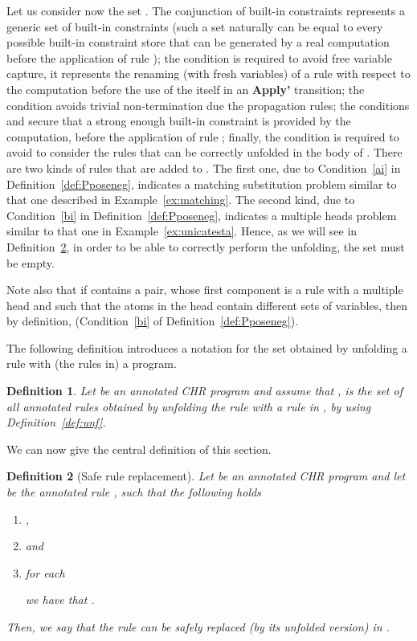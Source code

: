 \documentclass{tlp}
\newtheorem{definition}{Definition} \newtheorem{proposition}{Proposition} \newtheorem{example}{Example} \newtheorem{corollary}{Corollary} \newtheorem{theorem}{Theorem} \newtheorem{lemma}{Lemma}
\begin{document}
Let us consider now the set .
The conjunction of built-in constraints 
represents a generic set of built-in constraints
(such a set naturally can be equal to every possible built-in constraint store that can
be generated by a real computation before the application of rule ); the
condition 
is required to avoid free variable capture,
it represents the renaming (with fresh variables) of a rule  with respect to the computation
before the use of the  itself in an \textbf{Apply'} transition;
the condition  avoids trivial non-termination due the propagation rules;
the conditions  and
 secure that a strong enough built-in constraint
is provided by the computation, before the application of rule ;
finally, the condition
 is required
to avoid to consider the rules that can be correctly unfolded in the body of .
There are two kinds of rules that are added to .
The first one, due to Condition~\ref{ai} in Definition~\ref{def:Pposeneg},
indicates a matching substitution problem similar to that one described  in Example~\ref{ex:matching}. The second kind, due to Condition~\ref{bi} in Definition~\ref{def:Pposeneg}, indicates a multiple
heads problem similar to that one in Example~\ref{ex:unicatesta}.
Hence, as we will see in Definition~\ref{def:nsafedel}, in
order to be able to correctly perform the unfolding, the set  must be empty.

Note also that if  contains a pair, whose first component is
a rule with a multiple head and such that the atoms in the head contain different sets of variables, then by definition,
 (Condition~\ref{bi} of Definition~\ref{def:Pposeneg}).


The following definition introduces a notation for the set obtained by unfolding a rule with (the rules in) a program.

\begin{definition}
Let  be an annotated CHR program and assume that
,
 is the set of all annotated rules obtained by unfolding
the rule  with a rule in , by using Definition~\ref{def:unf}.
\end{definition}

We can now give the central definition of this section.

\begin{definition}[{\sc Safe rule replacement}]\label{def:nsafedel}
Let  be an annotated CHR program and let  be the annotated rule , such that the following
holds
\begin{enumerate}
\item[i)] ,
\item[ii)]   and
\item[iii)] for each

we have that
.
\end{enumerate}
Then, we say that the rule 
can be safely replaced (by its unfolded version) in .
\end{definition}
\end{document}

